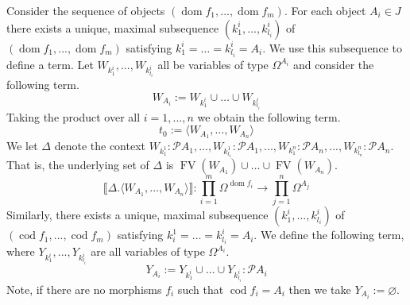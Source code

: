\documentclass{birkjour}
\theoremstyle{plain}
\theoremstyle{definition}
\newcommand{\call}[1]{\mathcal{#1}}
\newcommand{\lto}{\longrightarrow}
\begin{document}
	Consider the sequence of objects $(\operatorname{dom}f_1,...,\operatorname{dom}f_m)$. For each object $A_i \in J$ there exists a unique, maximal subsequence $(k^i_1,...,k^i_{l_i})$ of $(\operatorname{dom}f_1,...,\operatorname{dom}f_m)$ satisfying $k^i_1 = \hdots = k^i_{l_i} = A_i$. We use this subsequence to define a term. Let $W_{k_1^i},...,W_{k_{l_i}^i}$ all be variables of type $\Omega^{A_i}$ and consider the following term.
	\begin{equation}
		W_{A_i} := W_{k_1^i} \cup \hdots \cup W_{k_{l_i}^i}
	\end{equation}
	Taking the product over all $i = 1,...,n$ we obtain the following term.
	\begin{equation}
		t_0 := \langle W_{A_1}, \hdots, W_{A_n}\rangle
	\end{equation}
	We let $\Delta$ denote the context $W_{k_1^1}:\call{P}A_1,...,W_{k_{l_1}^1}:\call{P}A_1,...,W_{k_1^n}:\call{P}A_n,...,W_{k_{l_n}^n}:\call{P}A_n$. That is, the underlying set of $\Delta$ is $\operatorname{FV}(W_{A_1}) \cup \hdots \cup \operatorname{FV}(W_{A_n})$.
	\begin{equation}\label{eq:compression}
		\llbracket \Delta. \langle W_{A_1},...,W_{A_n}\rangle \rrbracket: \prod_{i = 1}^m \Omega^{\operatorname{dom}f_i} \lto \prod_{j = 1}^n \Omega^{A_j}
	\end{equation}
	Similarly, there exists a unique, maximal subsequence $(k_1^i,...,k_{l_i}^i)$ of $(\operatorname{cod}f_1,...,\operatorname{cod}f_m)$ satisfying $k_i^1 = \hdots = k_{l_i}^i = A_i$. We define the following term, where $Y_{k_1^i},...,Y_{k_{l_i}^i}$ are all variables of type $\Omega^{A_i}$.
	\begin{equation}
		Y_{A_i} := Y_{k_1^i} \cup \hdots \cup Y_{k_{l_i}^i}: \call{P}A_i
	\end{equation}
	Note, if there are no morphisms $f_i$ such that $\operatorname{cod}f_i = A_i$ then we take $Y_{A_i} := \varnothing$.
	
\end{document}
